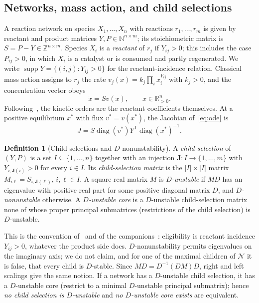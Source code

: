 \documentclass[11pt,a4paper]{article}
\theoremstyle{plain}
\theoremstyle{definition}
\newtheorem{definition}[theorem]{Definition}
\theoremstyle{remark}
\newcommand{\R}{\mathbb{R}}
\newcommand{\N}{\mathbb{N}}
\newcommand{\Z}{\mathbb{Z}}
\newcommand{\diag}{\operatorname{diag}}
\newcommand{\supp}{\operatorname{supp}}
\newcommand{\xs}{x^{*}}
\newcommand{\vs}{v^{*}}
\newcommand{\Osc}{\mathcal{N}}
\begin{document}
\subsection{Networks, mass action, and child selections}\label{sec:defs}

A reaction network on species $X_1,\dots,X_n$ with reactions $r_1,\dots,r_m$ is given by reactant and product matrices $Y,P\in\N^{n\times m}$; its stoichiometric matrix is $S=P-Y\in\Z^{n\times m}$. Species $X_i$ is a \emph{reactant} of $r_j$ if $Y_{ij}>0$; this includes the case $P_{ij}>0$, in which $X_i$ is a catalyst or is consumed and partly regenerated. We write $\supp Y=\{(i,j):Y_{ij}>0\}$ for the reactant-incidence relation. Classical mass action assigns to $r_j$ the rate $v_j(x)=k_j\prod_ix_i^{Y_{ij}}$ with $k_j>0$, and the concentration vector obeys
\begin{equation}\label{eq:ode}
\dot x=Sv(x),\qquad x\in\R_{>0}^n .
\end{equation}
Following~\cite{HornJackson1972,Feinberg2019}, the kinetic orders are the reactant coefficients themselves. At a positive equilibrium $\xs$ with flux $\vs=v(\xs)$, the Jacobian of~\eqref{eq:ode} is
\begin{equation}\label{eq:jac}
J=S\diag(\vs)Y^{\mathsf T}\diag(\xs)^{-1}.
\end{equation}

\begin{definition}[Child selections and $D$-nonunstability]\label{def:child}
A \emph{child selection} of $(Y,P)$ is a set $I\subseteq\{1,\dots,n\}$ together with an injection $\mathbf J\colon I\to\{1,\dots,m\}$ with $Y_{i,\mathbf J(i)}>0$ for every $i\in I$. Its \emph{child-selection matrix} is the $|I|\times|I|$ matrix $M_{i\ell}=S_{i,\mathbf J(\ell)}$, $i,\ell\in I$. A square real matrix $M$ is \emph{$D$-unstable} if $MD$ has an eigenvalue with positive real part for some positive diagonal matrix $D$, and \emph{$D$-nonunstable} otherwise. A \emph{$D$-unstable core} is a $D$-unstable child-selection matrix none of whose proper principal submatrices (restrictions of the child selection) is $D$-unstable.
\end{definition}

This is the convention of~\cite{VassenaStadler2024,BSV2025} and of the companions~\cite{ParameterRich2026,KineticOrder2026}: eligibility is reactant incidence $Y_{ij}>0$, whatever the product side does. $D$-nonunstability permits eigenvalues on the imaginary axis; we do not claim, and for one of the maximal children of $\Osc$ it is false, that every child is $D$-stable. Since $MD=D^{-1}(DM)D$, right and left scalings give the same notion. If a network has a $D$-unstable child selection, it has a $D$-unstable core (restrict to a minimal $D$-unstable principal submatrix); hence \emph{no child selection is $D$-unstable} and \emph{no $D$-unstable core exists} are equivalent.
\end{document}
